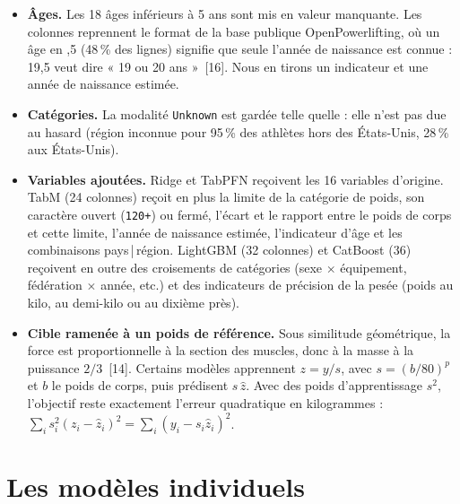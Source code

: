 \documentclass[11pt,a4paper]{article}
\newcommand{\code}[1]{\texttt{\small #1}}
\begin{document}
\begin{itemize}
\item \textbf{Âges.} Les 18 âges inférieurs à 5 ans sont mis en valeur manquante. Les colonnes reprennent le
format de la base publique OpenPowerlifting, où un âge en ,5 (48\,\% des lignes) signifie que seule l'année de
naissance est connue : 19,5 veut dire « 19 ou 20 ans »~[16]. Nous en tirons un indicateur et une année de
naissance estimée.
\item \textbf{Catégories.} La modalité \code{Unknown} est gardée telle quelle : elle n'est pas due au hasard
(région inconnue pour 95\,\% des athlètes hors des États-Unis, 28\,\% aux États-Unis).
\item \textbf{Variables ajoutées.} Ridge et TabPFN reçoivent les 16 variables d'origine. TabM (24 colonnes) reçoit
en plus la limite de la catégorie de poids, son caractère ouvert (\code{120+}) ou fermé, l'écart et le rapport
entre le poids de corps et cette limite, l'année de naissance estimée, l'indicateur d'âge et les combinaisons
pays\,|\,région. LightGBM (32 colonnes) et CatBoost (36) reçoivent en outre des croisements de catégories
(sexe $\times$ équipement, fédération $\times$ année, etc.) et des indicateurs de précision de la pesée
(poids au kilo, au demi-kilo ou au dixième près).
\item \textbf{Cible ramenée à un poids de référence.} Sous similitude géométrique, la force est proportionnelle
à la section des muscles, donc à la masse à la puissance $2/3$~[14]. Certains modèles apprennent $z = y/s$,
avec $s = (b/80)^p$ et $b$ le poids de corps, puis prédisent $s\,\hat z$. Avec des poids d'apprentissage $s^2$,
l'objectif reste exactement l'erreur quadratique en kilogrammes : $\sum_i s_i^2 (z_i - \hat z_i)^2 =
\sum_i (y_i - s_i \hat z_i)^2$.
\end{itemize}

\section{Les modèles individuels}\label{sec:modeles}
\end{document}
